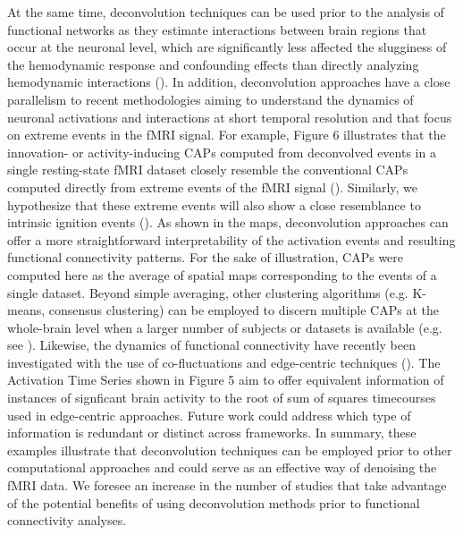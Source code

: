 At the same time, deconvolution techniques can be used prior to the analysis of functional networks as they estimate interactions between brain regions that occur at the neuronal level, which are significantly less affected the slugginess of the hemodynamic response and confounding effects than directly analyzing hemodynamic interactions (\citealt{Gitelman2003Modelingregionalpsychophysiologic}). In addition, deconvolution approaches have a close parallelism to recent methodologies aiming to understand the dynamics of neuronal activations and interactions at short temporal resolution and that focus on extreme events in the fMRI signal. For example, Figure 6 illustrates that the innovation- or activity-inducing CAPs computed from deconvolved events in a single resting-state fMRI dataset closely resemble the conventional CAPs computed directly from extreme events of the fMRI signal (\citealt{Liu2013Timevaryingfunctional,Liu2013Decompositionspontaneousbrain,Liu2018Coactivationpatterns,cifre2020revisiting,Cifre2020Furtherresultswhy,Zhang2020relationshipBOLDneural,Tagliazucchi2011,Tagliazucchi2012,Tagliazucchi2016,Rolls2021}). Similarly, we hypothesize that these extreme events will also show a close resemblance to intrinsic ignition events (\citealt{Deco2017a,Deco2017}). As shown in the maps, deconvolution approaches can offer a more straightforward interpretability of the activation events and resulting functional connectivity patterns. For the sake of illustration, CAPs were computed here as the average of spatial maps corresponding to the events of a single dataset. Beyond simple averaging, other clustering algorithms (e.g. K-means, consensus clustering) can be employed to discern multiple CAPs at the whole-brain level when a larger number of subjects or datasets is available (e.g. see \citealt{Karahanoglu2015Transientbrainactivity}). Likewise, the dynamics of functional connectivity have recently been investigated with the use of co-fluctuations and edge-centric techniques (\citealt{Faskowitz2020,Esfahlani2020Highamplitudecofluctuations,Jo2021,Sporns2021,Oort2018}). The Activation Time Series shown in Figure 5 aim to offer equivalent information of instances of signficant brain activity to the root of sum of squares timecourses used in edge-centric approaches. Future work could address which type of information is redundant or distinct across frameworks. In summary, these examples illustrate that deconvolution techniques can be employed prior to other computational approaches and could serve as an effective way of denoising the fMRI data. We foresee an increase in the number of studies that take advantage of the potential benefits of using deconvolution methods prior to functional connectivity analyses.

